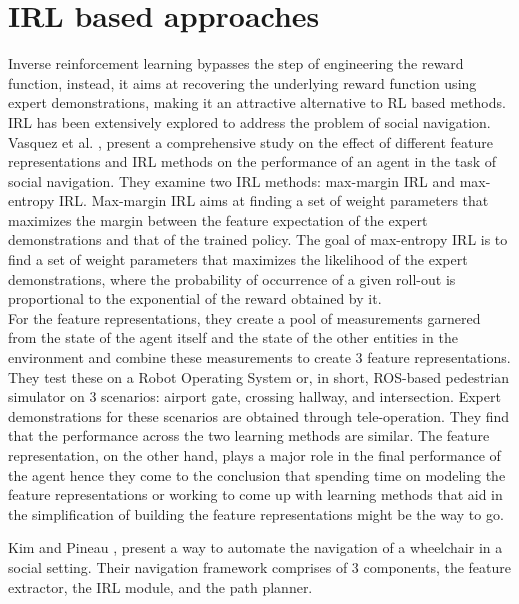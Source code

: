 \section{IRL based approaches}
Inverse reinforcement learning bypasses the step of engineering the reward function, instead, it aims at recovering the underlying reward function using expert demonstrations, making it an attractive alternative to RL based methods. IRL has been extensively explored to address the problem of social navigation. \\
Vasquez et al. \cite{vasquez_inverse_2014}, present a comprehensive study on the effect of different feature representations and IRL methods on the performance of an agent in the task of social navigation. They examine two IRL methods: max-margin IRL and max-entropy IRL. Max-margin IRL aims at finding a set of weight parameters that maximizes the margin between the feature expectation of the expert demonstrations and that of the trained policy. The goal of max-entropy IRL is to find a set of weight parameters that maximizes the likelihood of the expert demonstrations, where the probability of occurrence of a given roll-out is proportional to the exponential of the reward obtained by it. \\
For the feature representations, they create a pool of measurements garnered from the state of the agent itself and the state of the other entities in the environment and combine these measurements to create 3 feature representations. \\
They test these on a Robot Operating System or, in short, ROS-based pedestrian simulator on 3 scenarios: airport gate, crossing hallway, and intersection. Expert demonstrations for these scenarios are obtained through tele-operation. They find that the performance across the two learning methods are similar. The feature representation, on the other hand, plays a major role in the final performance of the agent hence they come to the conclusion that spending time on modeling the feature representations or working to come up with learning methods that aid in the simplification of building the feature representations might be the way to go.
\\
\par
Kim and Pineau \cite{kim_socially_2016}, present a way to automate the navigation of a wheelchair in a social setting. Their navigation framework comprises of $3$ components, the feature extractor, the IRL module, and the path planner.\\
